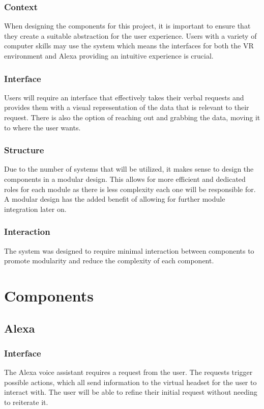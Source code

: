 \documentclass[onecolumn, draftclsnofoot,10pt, compsoc]{IEEEtran}
\begin{document}
        \subsubsection{Context}
            When designing the components for this project, it is important to ensure that they create a suitable abstraction for the user experience. Users with a variety of computer skills may use the system which means the interfaces for both the VR environment and Alexa providing an intuitive experience is crucial.
            
        \subsubsection{Interface}
            Users will require an interface that effectively takes their verbal requests and provides them with a visual representation of the data that is relevant to their request.
            There is also the option of reaching out and grabbing the data, moving it to where the user wants.
            
        \subsubsection{Structure}
            Due to the number of systems that will be utilized, it makes sense to design the components in a modular design. This allows for more efficient and dedicated roles for each module as there is less complexity each one will be responsible for. A modular design has the added benefit of allowing for further module integration later on.
            
        \subsubsection{Interaction}
            The system was designed to require minimal interaction between components to promote modularity and reduce the complexity of each component. 

\section{Components}
    \subsection{Alexa}
        \subsubsection{Interface}
            The Alexa voice assistant requires a request from the user. The requests trigger possible actions, which all send information to the virtual headset for the user to interact with. The user will be able to refine their initial request without needing to reiterate it. 
            
\end{document}
